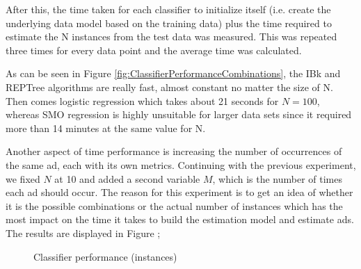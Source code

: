 \documentclass{sig-alternate}
\begin{document}
After this, the time taken for each classifier to initialize itself (i.e. create the underlying data model based on the training data) plus the time required to estimate the N instances from the test data was measured. This was repeated three times for every data point and the average time was calculated.

As can be seen in Figure \ref{fig:ClassifierPerformanceCombinations}, the IBk and REPTree algorithms are really fast, almost constant no matter the size of N. Then comes logistic regression which takes about 21 seconds for \(N = 100\), whereas SMO regression is highly unsuitable for larger data sets since it required more than 14 minutes at the same value for N.

Another aspect of time performance is increasing the number of occurrences of the same ad, each with its own metrics. Continuing with the previous experiment, we fixed \(N\) at 10 and added a second variable \(M\), which is the number of times each ad should occur. The reason for this experiment is to get an idea of whether it is the possible combinations or the actual number of instances which has the most impact on the time it takes to build the estimation model and estimate ads. The results are displayed in Figure ;

\begin{figure}[htb]
\begin{center}

    \caption{Classifier performance (instances)}
    \label{fig:ClassifierPerformanceInstances}
\end{center}
\end{figure}
\end{document}
